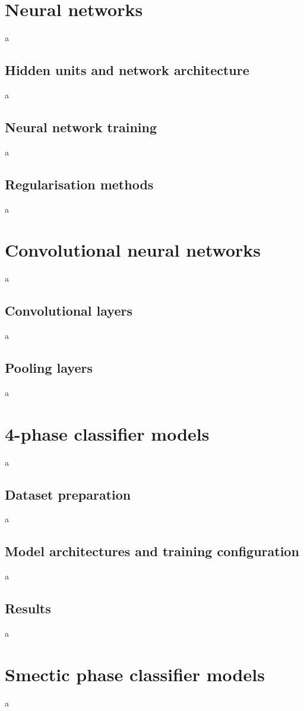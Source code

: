 \documentclass[12pt]{article}
\begin{document}
\section{Neural networks}
a
\subsection{Hidden units and network architecture}
a
\subsection{Neural network training}
a
\subsection{Regularisation methods}
a
\section{Convolutional neural networks}
a
\subsection{Convolutional layers}
a
\subsection{Pooling layers}
a
\section{4-phase classifier models}
a
\subsection{Dataset preparation}
a
\subsection{Model architectures and training configuration}
a
\subsection{Results}
a
\section{Smectic phase classifier models}
a
\end{document}
